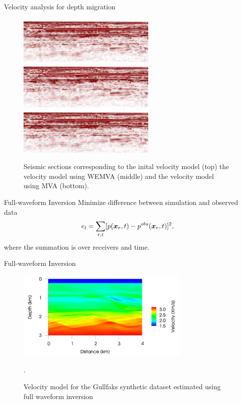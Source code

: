\documentclass[xcolor=dvipsnames,notes]{beamer}
\begin{document}
%
\begin{frame}{Velocity analysis for depth migration}
%
\begin{figure}
\includegraphics[width=0.6\textwidth]{Fig/si-fig-504.pdf}
\includegraphics[width=0.6\textwidth]{Fig/si-fig-505.pdf}
\includegraphics[width=0.6\textwidth]{Fig/si-fig-506.pdf}
\caption{Seismic sections corresponding to the inital velocity model (top)
         the velocity model using WEMVA (middle) and the velocity model using MVA (bottom).}
\label{fig:si-fig-303}
\end{figure}
\end{frame}
\begin{frame}{Full-waveform Inversion}
Minimize difference between simulation and observed data
%
\begin{eqnarray}
  e_l = \sum_{r,t}[p(\mbox{\boldmath $x$}_r,t)-p^{obs}(\mbox{\boldmath $x$}_r,t)]^2,
\end{eqnarray}
where the summation is over receivers and time.
\end{frame}
\begin{frame}{Full-waveform Inversion}
%
\begin{figure}
\includegraphics[width=0.75\textwidth]{Fig/si-fig-511.pdf}
\caption{Velocity model for the Gullfaks synthetic dataset estimated using full waveform inversion}.
\label{fig:si-fig-304}
\end{figure}
\end{frame}
\end{document}
